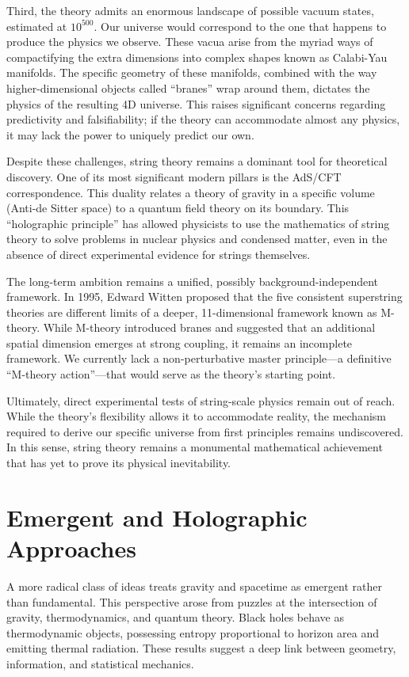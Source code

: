 Third, the theory admits an enormous landscape of possible vacuum states, estimated at $10^{500}$.
Our universe would correspond to the one that happens to produce the physics we observe.
These vacua arise from the myriad ways of compactifying the extra dimensions into complex shapes known as Calabi-Yau manifolds.
The specific geometry of these manifolds, combined with the way higher-dimensional objects called ``branes'' wrap around them, dictates the physics of the resulting 4D universe.
This raises significant concerns regarding predictivity and falsifiability; if the theory can accommodate almost any physics, it may lack the power to uniquely predict our own.

Despite these challenges, string theory remains a dominant tool for theoretical discovery.
One of its most significant modern pillars is the AdS/CFT correspondence.
This duality relates a theory of gravity in a specific volume (Anti-de Sitter space) to a quantum field theory on its boundary.
This ``holographic principle'' has allowed physicists to use the mathematics of string theory to solve problems in nuclear physics and condensed matter,
even in the absence of direct experimental evidence for strings themselves.

The long-term ambition remains a unified, possibly background-independent framework.
In 1995, Edward Witten proposed that the five consistent superstring theories are different limits of a deeper, 11-dimensional framework known as M-theory.
While M-theory introduced branes and suggested that an additional spatial dimension emerges at strong coupling, it remains an incomplete framework.
We currently lack a non-perturbative master principle—a definitive ``M-theory action''—that would serve as the theory's starting point.

Ultimately, direct experimental tests of string-scale physics remain out of reach.
While the theory's flexibility allows it to accommodate reality, the mechanism required to derive our specific universe from first principles remains undiscovered.
In this sense, string theory remains a monumental mathematical achievement that has yet to prove its physical inevitability.


\section{Emergent and Holographic Approaches}

A more radical class of ideas treats gravity and spacetime as emergent rather than fundamental. This perspective arose from puzzles at the intersection of gravity, thermodynamics, and quantum theory. Black holes behave as thermodynamic objects, possessing entropy proportional to horizon area and emitting thermal radiation. These results suggest a deep link between geometry, information, and statistical mechanics.

